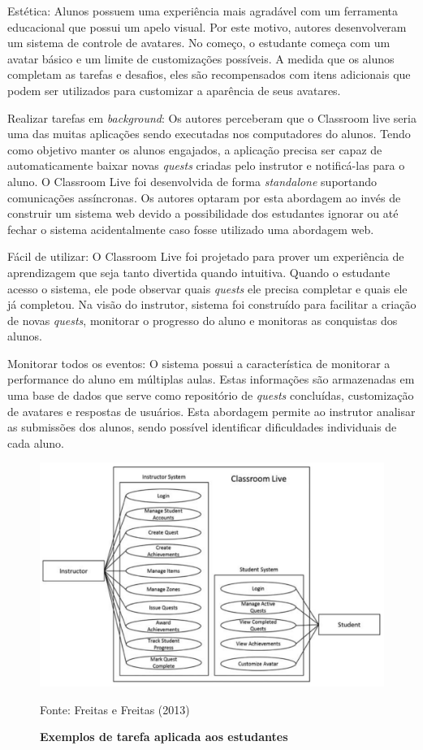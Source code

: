 \documentclass[
	12pt,				%
	oneside,			%
	a4paper,			%
	english,			%
	french,				%
	spanish,			%
	brazil,				%
	]{abntex2}
\begin{document}
Estética: Alunos possuem uma experiência mais agradável com um ferramenta educacional que possui um apelo visual. Por este motivo, autores desenvolveram um sistema de controle de avatares. No começo, o estudante começa com um avatar básico e um limite de customizações possíveis. A medida que os alunos completam as tarefas e desafios, eles são recompensados com itens adicionais que podem ser utilizados para customizar a aparência de seus avatares.

Realizar tarefas em \textit{background}: Os autores perceberam que o Classroom live seria uma das muitas aplicações sendo executadas nos computadores do alunos. Tendo como objetivo manter os alunos engajados, a aplicação precisa ser capaz de automaticamente baixar novas \textit{quests} criadas pelo instrutor e notificá-las para o aluno. O Classroom Live foi desenvolvida de forma \textit{standalone} suportando comunicações assíncronas. Os autores optaram por esta abordagem ao invés de construir um sistema web devido a possibilidade dos estudantes ignorar ou até fechar o sistema acidentalmente caso fosse utilizado uma abordagem web.

Fácil de utilizar: O Classroom Live foi projetado para prover um experiência de aprendizagem que seja tanto divertida quando intuitiva. Quando o estudante acesso o sistema, ele pode observar quais \textit{quests} ele precisa completar e quais ele já completou. Na visão do instrutor, sistema foi construído para facilitar a criação de novas \textit{quests}, monitorar o progresso do aluno e monitoras as conquistas dos alunos.

Monitorar todos os eventos: O sistema possui a característica de monitorar a performance do aluno em múltiplas aulas. Estas informações são armazenadas em uma base de dados que serve como repositório de \textit{quests} concluídas, customização de avatares e respostas de usuários. Esta abordagem permite ao instrutor analisar as submissões dos alunos, sendo possível identificar dificuldades individuais de cada aluno. 

\begin{figure}[ht]
\centering
\caption{\textbf{Exemplos de tarefa aplicada aos estudantes}}
\includegraphics[width=1\textwidth]{imagens/classroom_diagrama.png}

Fonte: Freitas e Freitas (2013)
\label{fig:classroom_diagrama}
\end{figure}
\end{document}
